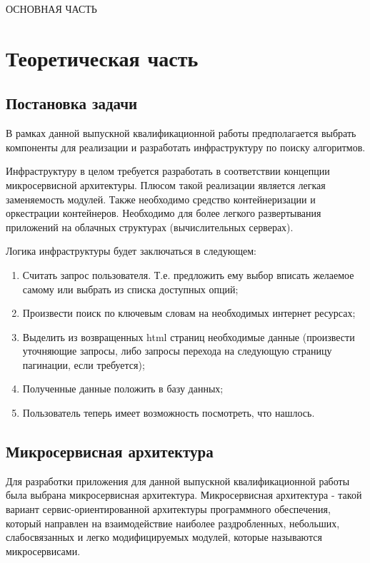 \Main
\hspace{0pt}
\vfill
\begin{center}
ОСНОВНАЯ ЧАСТЬ
\end{center}
\vfill
\hspace{0pt}
\pagebreak

\chapter{Теоретическая часть}
\label{cha:ch_1}

\section{Постановка задачи}
В рамках данной выпускной квалификационной работы предполагается выбрать
компоненты для реализации и разработать инфраструктуру по поиску алгоритмов.

Инфраструктуру в целом требуется разработать в соответствии концепции
микросервисной архитектуры. Плюсом такой реализации является легкая заменяемость
модулей. Также необходимо средство контейнеризации и оркестрации контейнеров.
Необходимо для более легкого развертывания приложений на облачных структурах
(вычислительных серверах).

Логика инфраструктуры будет заключаться в следующем:
\begin{enumerate}[label=\arabic*.]
    \item Считать запрос пользователя. Т.е. предложить ему выбор вписать желаемое самому или выбрать из списка доступных опций;
    \item Произвести поиск по ключевым словам на необходимых интернет ресурсах;
    \item Выделить из возвращенных html страниц необходимые данные (произвести уточняющие запросы, либо запросы перехода на следующую страницу пагинации, если требуется);
    \item Полученные данные положить в базу данных;
    \item Пользователь теперь имеет возможность посмотреть, что нашлось.
\end{enumerate}

\section{Микросервисная архитектура}
Для разработки приложения для данной выпускной квалификационной работы была выбрана микросервисная архитектура.
Микросервисная архитектура - такой вариант сервис-ориентированной архитектуры
программного обеспечения, который направлен на взаимодействие наиболее
раздробленных, небольших, слабосвязанных и легко модифицируемых модулей, которые
называются микросервисами.

